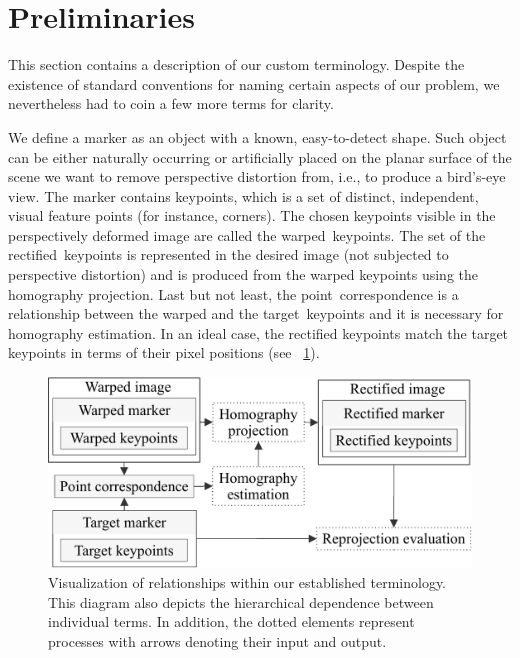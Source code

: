\section{Preliminaries}
\label{sec:HomographyPreliminaries}

This section contains a description of our custom terminology. Despite the existence of standard conventions for naming certain aspects of our problem, we nevertheless had to coin a few more terms for clarity.

We define a marker as an object with a known, easy-to-detect shape. Such object can be either naturally occurring or artificially placed on the planar surface of the scene we want to remove perspective distortion from, i.e., to produce a bird's-eye view. The marker contains keypoints, which is a set of distinct, independent, visual feature points (for instance, corners). The chosen keypoints visible in the perspectively deformed image are called the \mbox{warped keypoints}. The set of the \mbox{rectified keypoints} is represented in the desired image (not subjected to perspective distortion) and is produced from the warped keypoints using the homography projection. Last but not least, the \mbox{point correspondence} is a relationship between the warped and the \mbox{target keypoints} and it is necessary for homography estimation. In an ideal case, the rectified keypoints match the target keypoints in terms of their pixel positions (see \figstr{}~\ref{fig:HomographyTerminology}).

\begin{figure}[t]
    \centering
    \includegraphics[width=0.6\linewidth]{figures/homography/terminology.pdf}
    \caption[Homography ranking terminology]{Visualization of relationships within our established terminology. This diagram also depicts the hierarchical dependence between individual terms. In addition, the dotted elements represent processes with arrows denoting their input and output.}
    \label{fig:HomographyTerminology}
\end{figure}

